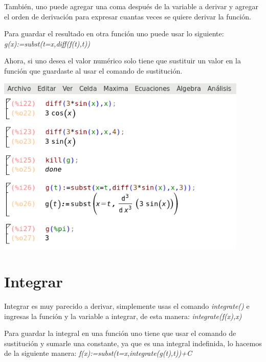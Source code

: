 \documentclass{article}
\begin{document}
También, uno puede agregar una coma después de la variable a derivar y agregar el orden de derivación para expresar cuantas veces se quiere derivar la función.

\vspace{0.3cm}

Para guardar el resultado en otra función uno puede usar lo siguiente: \textit{g(x):=subst(t=x,diff(f(t),t))}

\vspace{0.3cm}

Ahora, si uno desea el valor numérico solo tiene que sustituir un valor en la función que guardaste al usar el comando de sustitución. 

\begin{center}
	\includegraphics[width=12cm]{deriv.png}
    
\end{center}
\vspace{0.3cm}



\section{Integrar}

Integrar es muy parecido a derivar, simplemente usas el comando \textit{integrate()} e ingresas la función y la variable a integrar, de esta manera: \textit{integrate(f(x),x)}

Para guardar la integral en una función uno tiene que usar el comando de sustitución y sumarle una constante, ya que es una integral indefinida, lo hacemos de la siguiente manera: \textit{f(x):=subst(t=x,integrate(g(t),t))+C}

\vspace{0.3cm}
\end{document}
